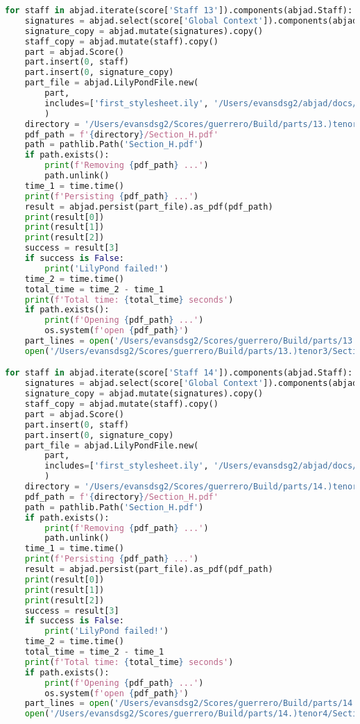 \begin{lstlisting}[language=Python, caption=Invocation Source Code]
for staff in abjad.iterate(score['Staff 13']).components(abjad.Staff):
    signatures = abjad.select(score['Global Context']).components(abjad.Staff)
    signature_copy = abjad.mutate(signatures).copy()
    staff_copy = abjad.mutate(staff).copy()
    part = abjad.Score()
    part.insert(0, staff)
    part.insert(0, signature_copy)
    part_file = abjad.LilyPondFile.new(
        part,
        includes=['first_stylesheet.ily', '/Users/evansdsg2/abjad/docs/source/_stylesheets/abjad.ily'],
        )
    directory = '/Users/evansdsg2/Scores/guerrero/Build/parts/13.)tenor3'
    pdf_path = f'{directory}/Section_H.pdf'
    path = pathlib.Path('Section_H.pdf')
    if path.exists():
        print(f'Removing {pdf_path} ...')
        path.unlink()
    time_1 = time.time()
    print(f'Persisting {pdf_path} ...')
    result = abjad.persist(part_file).as_pdf(pdf_path)
    print(result[0])
    print(result[1])
    print(result[2])
    success = result[3]
    if success is False:
        print('LilyPond failed!')
    time_2 = time.time()
    total_time = time_2 - time_1
    print(f'Total time: {total_time} seconds')
    if path.exists():
        print(f'Opening {pdf_path} ...')
        os.system(f'open {pdf_path}')
    part_lines = open('/Users/evansdsg2/Scores/guerrero/Build/parts/13.)tenor3/Section_H.ly').readlines()
    open('/Users/evansdsg2/Scores/guerrero/Build/parts/13.)tenor3/Section_H.ly', 'w').writelines(part_lines[15:-1])

for staff in abjad.iterate(score['Staff 14']).components(abjad.Staff):
    signatures = abjad.select(score['Global Context']).components(abjad.Staff)
    signature_copy = abjad.mutate(signatures).copy()
    staff_copy = abjad.mutate(staff).copy()
    part = abjad.Score()
    part.insert(0, staff)
    part.insert(0, signature_copy)
    part_file = abjad.LilyPondFile.new(
        part,
        includes=['first_stylesheet.ily', '/Users/evansdsg2/abjad/docs/source/_stylesheets/abjad.ily'],
        )
    directory = '/Users/evansdsg2/Scores/guerrero/Build/parts/14.)tenor4'
    pdf_path = f'{directory}/Section_H.pdf'
    path = pathlib.Path('Section_H.pdf')
    if path.exists():
        print(f'Removing {pdf_path} ...')
        path.unlink()
    time_1 = time.time()
    print(f'Persisting {pdf_path} ...')
    result = abjad.persist(part_file).as_pdf(pdf_path)
    print(result[0])
    print(result[1])
    print(result[2])
    success = result[3]
    if success is False:
        print('LilyPond failed!')
    time_2 = time.time()
    total_time = time_2 - time_1
    print(f'Total time: {total_time} seconds')
    if path.exists():
        print(f'Opening {pdf_path} ...')
        os.system(f'open {pdf_path}')
    part_lines = open('/Users/evansdsg2/Scores/guerrero/Build/parts/14.)tenor4/Section_H.ly').readlines()
    open('/Users/evansdsg2/Scores/guerrero/Build/parts/14.)tenor4/Section_H.ly', 'w').writelines(part_lines[15:-1])


\end{lstlisting}
